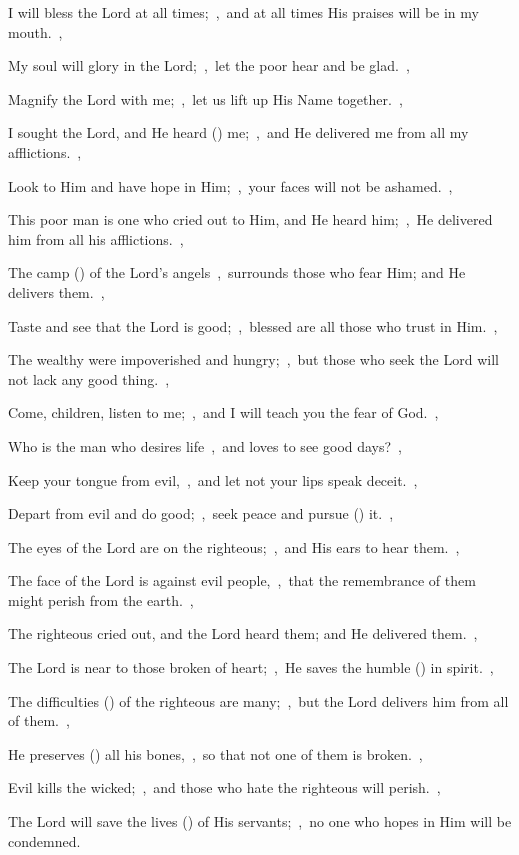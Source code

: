 \documentclass[12pt,twoside,a5paper]{article}
\begin{document}

\begin{normalparskip}
  I will bless the Lord at all times;~\sep\ and at all times His praises will be in my mouth.~\sep


  My soul will glory in the Lord;~\sep\ let the poor hear and be glad.~\sep

  Magnify the Lord with me;~\sep\ let us lift up His Name together.~\sep

  I sought the Lord, and He heard () me;~\sep\ and He delivered me from all my afflictions.~\sep

  Look to Him and have hope in Him;~\sep\ your faces will not be ashamed.~\sep

  This poor man is one who cried out to Him, and He heard him;~\sep\ He delivered him from all his afflictions.~\sep

  The camp () of the Lord's angels~\sep\ surrounds those who fear Him; and He delivers them.~\sep

  Taste and see that the Lord is good;~\sep\ blessed are all those who trust in Him.~\sep

  The wealthy were impoverished and hungry;~\sep\ but those who seek the Lord will not lack any good thing.~\sep

  Come, children, listen to me;~\sep\ and I will teach you the fear of God.~\sep

  Who is the man who desires life~\sep\ and loves to see good days?~\sep

  Keep your tongue from evil,~\sep\ and let not your lips speak deceit.~\sep

  Depart from evil and do good;~\sep\ seek peace and pursue () it.~\sep

  The eyes of the Lord are on the righteous;~\sep\ and His ears to hear them.~\sep

  The face of the Lord is against evil people,~\sep\ that the remembrance of them might perish from the earth.~\sep

  The righteous cried out, and the Lord heard them; and He delivered them.~\sep

  The Lord is near to those broken of heart;~\sep\ He saves the humble () in spirit.~\sep

  The difficulties () of the righteous are many;~\sep\ but the Lord delivers him from all of them.~\sep

  He preserves () all his bones,~\sep\ so that not one of them is broken.~\sep

  Evil kills the wicked;~\sep\ and those who hate the righteous will perish.~\sep

  The Lord will save the lives () of His servants;~\sep\ no one who hopes in Him will be condemned.
\end{normalparskip}
\end{document}
